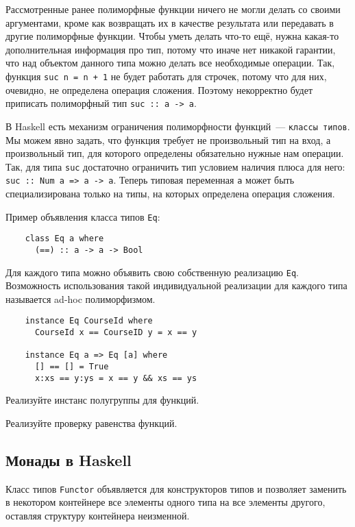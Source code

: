 Рассмотренные ранее полиморфные функции ничего не могли делать со своими аргументами, кроме как возвращать их в качестве результата или передавать в другие полиморфные функции.
Чтобы уметь делать что-то ещё, нужна какая-то дополнительная информация про тип, потому что иначе нет никакой гарантии, что над объектом данного типа можно делать все необходимые операции.
Так, функция \texttt{suc n = n + 1} не будет работать для строчек, потому что для них, очевидно, не определена операция сложения.
Поэтому некорректно будет приписать полиморфный тип \texttt{suc :: a -> a}.

В Haskell есть механизм ограничения полиморфности функций~--- \texttt{классы типов}.
Мы можем явно задать, что функция требует не произвольный тип на вход, а произвольный тип, для которого определены обязательно нужные нам операции.
Так, для типа \texttt{suc} достаточно ограничить тип условием наличия плюса для него: \texttt{suc :: Num a => a -> a}.
Теперь типовая переменная \texttt{a} может быть специализирована только на типы, на которых определена операция сложения.

Пример объявления класса типов \texttt{Eq}:
\begin{verbatim}
    class Eq a where
      (==) :: a -> a -> Bool
\end{verbatim}

Для каждого типа можно объявить свою собственную реализацию \texttt{Eq}.
Возможность использования такой индивидуальной реализации для каждого типа называется ad-hoc полиморфизмом.
\begin{verbatim}
    instance Eq CourseId where
      CourseId x == CourseID y = x == y

    instance Eq a => Eq [a] where
      [] == [] = True
      x:xs == y:ys = x == y && xs == ys
\end{verbatim}

\begin{task}
    Реализуйте инстанс полугруппы для функций.
\end{task}

\begin{task}
    Реализуйте проверку равенства функций.
\end{task}

\subsection{Монады в Haskell}

Класс типов \texttt{Functor} объявляется для конструкторов типов и позволяет заменить в некотором контейнере все элементы одного типа на все элементы другого, оставляя структуру контейнера неизменной.

